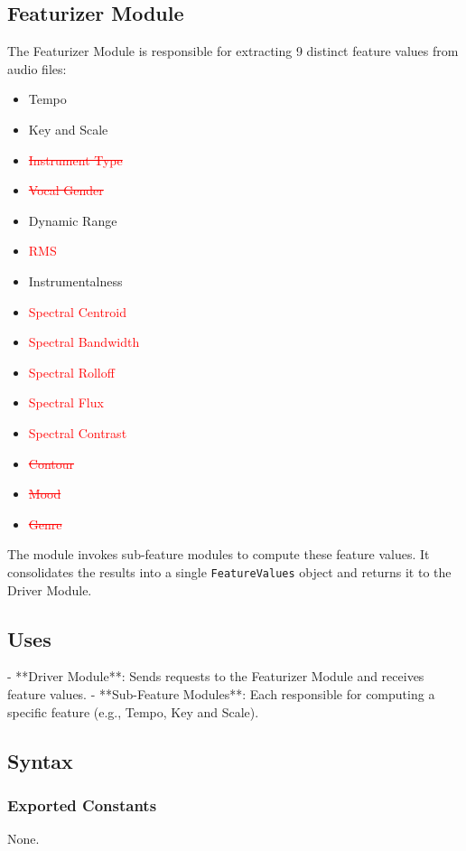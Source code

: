 \documentclass[12pt, titlepage]{article}
\begin{document}
\subsection{Featurizer Module}
The Featurizer Module is responsible for extracting 9 distinct feature values from audio files:
\begin{itemize}
    \item Tempo
    \item Key and Scale
    \item \textcolor{red}{\sout{Instrument Type}}
    \item \textcolor{red}{\sout{Vocal Gender}}
    \item Dynamic Range
    \item \textcolor{red}{RMS}
    \item Instrumentalness
    \item \textcolor{red}{Spectral Centroid}
    \item \textcolor{red}{Spectral Bandwidth}
    \item \textcolor{red}{Spectral Rolloff}
    \item \textcolor{red}{Spectral Flux}
    \item \textcolor{red}{Spectral Contrast}
    \item \textcolor{red}{\sout{Contour}}
    \item \textcolor{red}{\sout{Mood}}
    \item \textcolor{red}{\sout{Genre}}
\end{itemize}

The module invokes sub-feature modules to compute these feature values. It consolidates the results into a single \texttt{FeatureValues} object and returns it to the Driver Module.

\subsection{Uses}
- **Driver Module**: Sends requests to the Featurizer Module and receives feature values.
- **Sub-Feature Modules**: Each responsible for computing a specific feature (e.g., Tempo, Key and Scale).

\subsection{Syntax}

\subsubsection{Exported Constants}
None.
\end{document}
